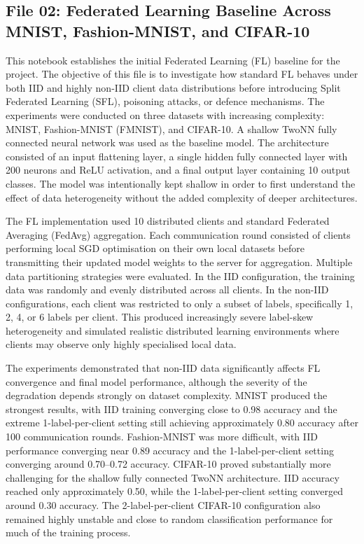 \subsection*{File 02: Federated Learning Baseline Across MNIST, Fashion-MNIST, and CIFAR-10}

This notebook establishes the initial Federated Learning (FL) baseline for the project. The objective of this file is to investigate how standard FL behaves under both IID and highly non-IID client data distributions before introducing Split Federated Learning (SFL), poisoning attacks, or defence mechanisms. The experiments were conducted on three datasets with increasing complexity: MNIST, Fashion-MNIST (FMNIST), and CIFAR-10. A shallow TwoNN fully connected neural network was used as the baseline model. The architecture consisted of an input flattening layer, a single hidden fully connected layer with 200 neurons and ReLU activation, and a final output layer containing 10 output classes. The model was intentionally kept shallow in order to first understand the effect of data heterogeneity without the added complexity of deeper architectures.

The FL implementation used 10 distributed clients and standard Federated Averaging (FedAvg) aggregation. Each communication round consisted of clients performing local SGD optimisation on their own local datasets before transmitting their updated model weights to the server for aggregation. Multiple data partitioning strategies were evaluated. In the IID configuration, the training data was randomly and evenly distributed across all clients. In the non-IID configurations, each client was restricted to only a subset of labels, specifically 1, 2, 4, or 6 labels per client. This produced increasingly severe label-skew heterogeneity and simulated realistic distributed learning environments where clients may observe only highly specialised local data.

The experiments demonstrated that non-IID data significantly affects FL convergence and final model performance, although the severity of the degradation depends strongly on dataset complexity. MNIST produced the strongest results, with IID training converging close to 0.98 accuracy and the extreme 1-label-per-client setting still achieving approximately 0.80 accuracy after 100 communication rounds. Fashion-MNIST was more difficult, with IID performance converging near 0.89 accuracy and the 1-label-per-client setting converging around 0.70--0.72 accuracy. CIFAR-10 proved substantially more challenging for the shallow fully connected TwoNN architecture. IID accuracy reached only approximately 0.50, while the 1-label-per-client setting converged around 0.30 accuracy. The 2-label-per-client CIFAR-10 configuration also remained highly unstable and close to random classification performance for much of the training process.


